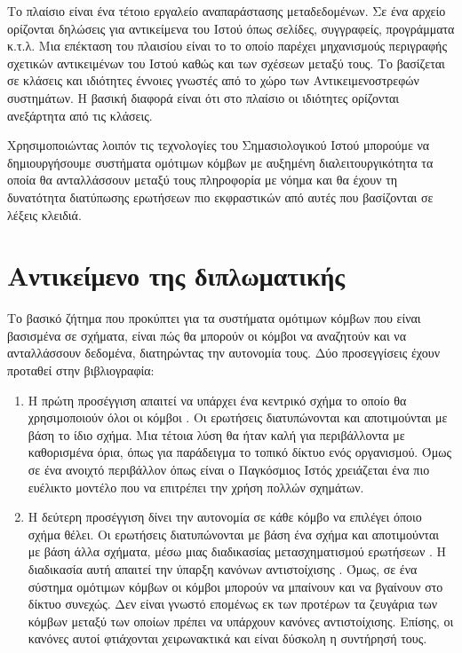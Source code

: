 Το πλαίσιο  είναι ένα τέτοιο εργαλείο αναπαράστασης
μεταδεδομένων. Σε ένα  αρχείο ορίζονται δηλώσεις για
αντικείμενα του Ιστού όπως σελίδες, συγγραφείς, προγράμματα κ.τ.λ.
Μια επέκταση του πλαισίου  είναι το  το
οποίο παρέχει μηχανισμούς περιγραφής σχετικών αντικειμένων του
Ιστού καθώς και των σχέσεων μεταξύ τους. Το 
βασίζεται σε κλάσεις και ιδιότητες έννοιες γνωστές από το χώρο των
Αντικειμενοστρεφών συστημάτων. Η βασική διαφορά είναι ότι στο
πλαίσιο  οι ιδιότητες ορίζονται ανεξάρτητα από τις
κλάσεις.

Χρησιμοποιώντας λοιπόν τις τεχνολογίες του Σημασιολογικού Ιστού
μπορούμε να δημιουργήσουμε συστήματα ομότιμων κόμβων με αυξημένη
διαλειτουργικότητα τα οποία θα ανταλλάσσουν μεταξύ τους πληροφορία
με νόημα και θα έχουν τη δυνατότητα διατύπωσης ερωτήσεων πιο
εκφραστικών από αυτές που βασίζονται σε λέξεις κλειδιά.


\section{Αντικείμενο της διπλωματικής}
Το βασικό ζήτημα που προκύπτει για τα συστήματα ομότιμων κόμβων
που είναι βασισμένα σε σχήματα, είναι πώς θα μπορούν οι κόμβοι να
αναζητούν και να ανταλλάσσουν δεδομένα, διατηρώντας την αυτονομία
τους. Δύο προσεγγίσεις έχουν προταθεί στην βιβλιογραφία:
\begin{enumerate}
\item Η πρώτη προσέγγιση απαιτεί να υπάρχει ένα κεντρικό σχήμα το
οποίο θα χρησιμοποιούν όλοι οι κόμβοι \cite{KokkinidisC04}. Οι
ερωτήσεις διατυπώνονται και αποτιμούνται με βάση το ίδιο σχήμα.
Μια τέτοια λύση θα ήταν καλή για περιβάλλοντα με καθορισμένα όρια,
όπως για παράδειγμα το τοπικό δίκτυο ενός οργανισμού. Όμως σε ένα
ανοιχτό περιβάλλον όπως είναι ο Παγκόσμιος Ιστός χρειάζεται ένα
πιο ευέλικτο μοντέλο που να επιτρέπει την χρήση πολλών σχημάτων.
\item Η δεύτερη προσέγγιση δίνει την αυτονομία σε κάθε κόμβο να επιλέγει όποιο σχήμα θέλει.
Οι ερωτήσεις διατυπώνονται με βάση ένα σχήμα και αποτιμούνται με
βάση άλλα σχήματα, μέσω μιας διαδικασίας μετασχηματισμού ερωτήσεων
. Η διαδικασία αυτή απαιτεί την ύπαρξη
κανόνων αντιστοίχισης  \cite{Piazza}. Όμως, σε
ένα σύστημα ομότιμων κόμβων οι κόμβοι μπορούν να μπαίνουν και να
βγαίνουν στο δίκτυο συνεχώς. Δεν είναι γνωστό επομένως εκ των
προτέρων τα ζευγάρια των κόμβων μεταξύ των οποίων πρέπει να
υπάρχουν κανόνες αντιστοίχισης. Επίσης, οι κανόνες αυτοί
φτιάχονται χειρωνακτικά και είναι δύσκολη η συντήρησή τους.
\end{enumerate}


